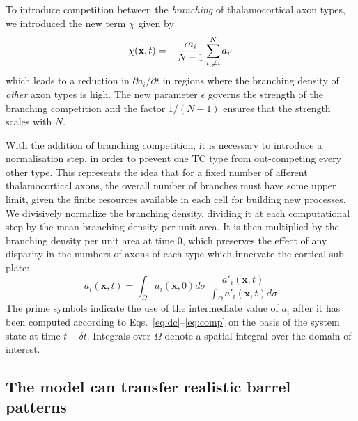 \documentclass[9pt,twocolumn,twoside,lineno]{pnas-new}
\begin{document}
To introduce competition between the \emph{branching} of thalamocortical axon
types, we introduced the new term $\chi$ given by
%
\begin{equation} \label{eq:comp}
\chi(\mathbf{x}, t) = - \frac{\epsilon  a_i}{N-1} \sum_{i' \ne i}^{N} a_{i'}
\end{equation}
%
which leads to a reduction in
${\partial a_i}/{\partial t}$
in regions where the branching density
of \emph{other} axon types is high. The new parameter $\epsilon$ governs the
strength of the branching competition and the factor $1/(N-1)$ ensures that the
strength scales with $N$.

With the addition of branching competition, it is necessary to introduce a
normalisation step, in order to prevent one TC type from out-competing every
other type. This represents the idea that for a fixed number of afferent
thalamocortical axons, the overall number of branches must have some upper
limit, given the finite resources available in each cell for building new
processes. We divisively normalize the branching density, dividing it at each
computational step by the mean branching density per unit area. It is then
multiplied by the branching density per unit area at time 0, which preserves
the effect of any disparity in the numbers of axons of each type which
innervate the cortical sub-plate:
%
\begin{equation} \label{eq:norm}
  a_i(\mathbf{x}, t) = \int_\Omega  a_i(\mathbf{x}, 0) d\sigma \; \frac {a'_i(\mathbf{x}, t)} {\int_\Omega
  a'_i(\mathbf{x}, t) d\sigma}
\end{equation}
%
The prime symbols indicate the use of the intermediate value of $a_i$ after it
has been computed according to Eqs.~\ref{eq:dc}--\ref{eq:comp} on the basis of
the system state at time $t-{\delta}t$. Integrals over $\Omega$ denote a
spatial integral over the domain of interest.

\subsection*{The model can transfer realistic barrel patterns}
\end{document}

